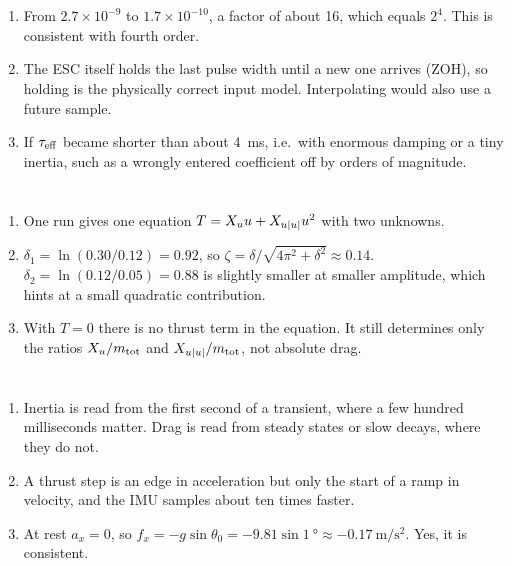 \section*{}
\begin{enumerate}
  \item From $2.7\times10^{-9}$ to $1.7\times10^{-10}$, a factor of about 16, which equals
        $2^4$. This is consistent with fourth order.
  \item The ESC itself holds the last pulse width until a new one arrives (ZOH), so holding is
        the physically correct input model. Interpolating would also use a future sample.
  \item If $\tau_\mathrm{eff}$ became shorter than about \qty{4}{\milli\second}, i.e.\ with enormous damping or a
        tiny inertia, such as a wrongly entered coefficient off by orders of magnitude.
\end{enumerate}

\section*{}
\begin{enumerate}
  \item One run gives one equation $T = X_u u + X_{u|u|} u^2$ with two unknowns.
  \item $\delta_1 = \ln(0.30/0.12) = 0.92$, so $\zeta = \delta/\sqrt{4\pi^2 + \delta^2} \approx 0.14$.
        $\delta_2 = \ln(0.12/0.05) = 0.88$ is slightly smaller at smaller amplitude, which hints at a
        small quadratic contribution.
  \item With $T = 0$ there is no thrust term in the equation. It still determines only the
        ratios $X_u/m_\mathrm{tot}$ and $X_{u|u|}/m_\mathrm{tot}$, not absolute drag.
\end{enumerate}

\section*{}
\begin{enumerate}
  \item Inertia is read from the first second of a transient, where a few hundred
        milliseconds matter. Drag is read from steady states or slow decays, where they do not.
  \item A thrust step is an edge in acceleration but only the start of a ramp in velocity, and the
        IMU samples about ten times faster.
  \item At rest $a_x = 0$, so $f_x = -g\sin\theta_0 = -9.81\sin\qty{1}{\degree} \approx
        \qty{-0.17}{\meter\per\second\squared}$. Yes, it is consistent.
\end{enumerate}

